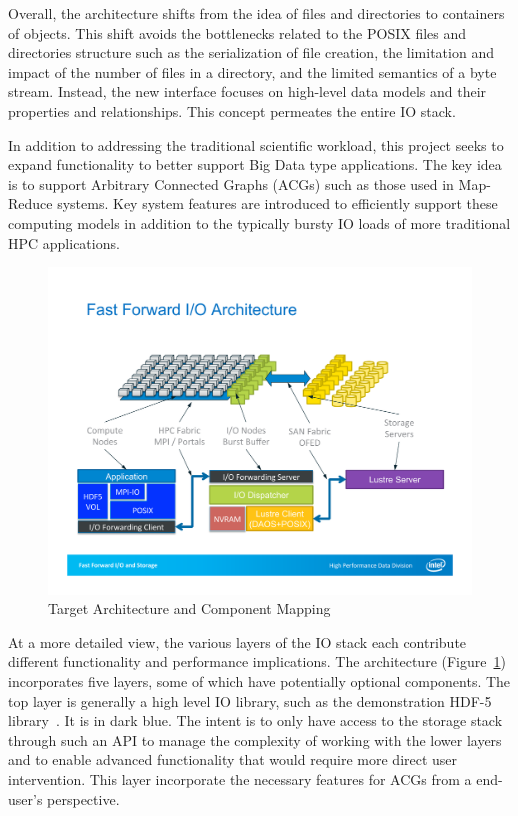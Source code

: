\documentclass[conference]{IEEEtran}
\begin{document}
Overall, the architecture shifts from the idea of files and directories to
containers of objects. This shift avoids the bottlenecks related to the POSIX
files and directories structure such as the serialization of file creation, the
limitation and impact of the number of files in a directory, and the limited
semantics of a byte stream. Instead, the new interface focuses on high-level
data models and their properties and relationships. This concept permeates the
entire IO stack.

In addition to addressing the traditional scientific workload, this project
seeks to expand functionality to better support Big Data type applications. The
key idea is to support Arbitrary Connected Graphs (ACGs) such as those used in
Map-Reduce systems. Key system features are introduced to efficiently support
these computing models in addition to the typically bursty IO loads of more
traditional HPC applications.

\begin{figure}[htbp]
\centering
\includegraphics[width=\columnwidth]{images/arch-mapping}
\caption{Target Architecture and Component Mapping}
\label{fig:arch-mapping}
\end{figure}

At a more detailed view, the various layers of the IO stack each contribute
different functionality and performance implications.  The
architecture (Figure~\ref{fig:arch-mapping}) incorporates five layers, some of
which have potentially optional components.  The top layer is generally a high
level IO library, such as the demonstration HDF-5 library~\cite{hdf5}. It is in
dark blue. The intent is to only have access to the storage stack through such
an API to manage the complexity of working with the lower layers and to enable
advanced functionality that would require more direct user intervention. This
layer incorporate the necessary features for ACGs from a end-user's
perspective.
\end{document}
